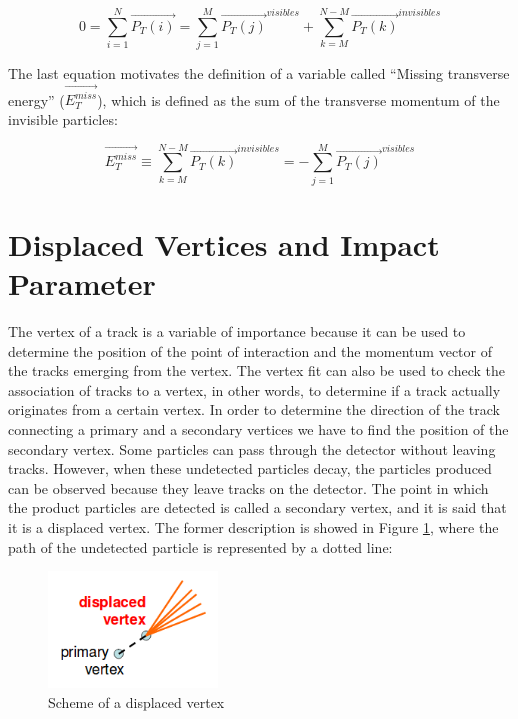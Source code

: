  \begin{equation}
  0 = \sum_{i=1}^N \vec{P_T(i)} = \sum_{j=1}^M \vec{P_T(j)}^{visibles} + \sum_{k=M}^{N-M} \vec{P_T(k)}^{invisibles}
 \end{equation}


 The last equation motivates the definition of a variable called ``Missing transverse energy'' ($\vec{E_T^{miss}}$), which is defined as the sum of the transverse momentum of the invisible
 particles:
 
 \begin{equation}
  \vec{E_T^{miss}} \equiv \sum_{k=M}^{N-M}\vec{P_T(k)}^{invisibles} = - \sum_{j=1}^M  \vec{P_T(j)}^{visibles}
 \end{equation}

 
 \section{Displaced Vertices and Impact Parameter}
The vertex of a track is a variable of importance because it can be used to determine the position of the point of interaction and the momentum vector of the tracks emerging from the vertex. The 
vertex fit can also be used to check the association of tracks to a vertex, in other words, to determine if a track actually originates from a certain vertex. In order to determine the direction of the track connecting a primary and a secondary vertices we have to find the position of the secondary vertex. Some particles can pass through the detector without leaving tracks. However, when these undetected particles decay, the particles produced can be observed because they leave tracks on the detector. The point in which the product particles are detected is called a secondary vertex, and it is said that it is a displaced vertex. The former description is showed in Figure \ref{Displaced_vertices}, where the path of the undetected particle is represented by a dotted line:

 
 \begin{figure}[h] \label{Displaced_vertices}
 \centering
 \caption{Scheme of a displaced vertex}
 \includegraphics[width=0.4\textwidth]{./Capitulos/VariableDefinitions/Displaced_vertex}  
 \end{figure}
 
